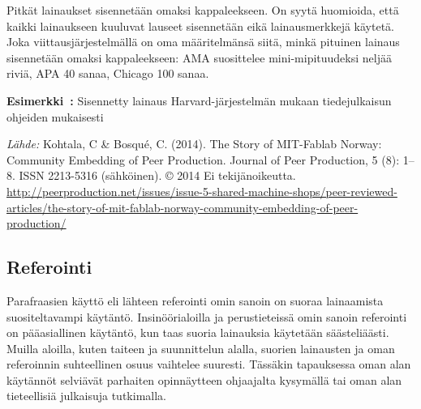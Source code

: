 \documentclass[finnish, 12pt, a4paper, elec, utf8, a-2b, online]{aaltothesis}
\begin{document}
Pitkät lainaukset sisennetään omaksi kappaleekseen. On syytä huomioida, että 
kaikki lainaukseen kuuluvat lauseet sisennetään eikä lainausmerkkejä käytetä. 
Joka viittausjärjestelmällä on oma määritelmänsä siitä, minkä pituinen lainaus 
sisennetään omaksi kappaleekseen: AMA suosittelee mini-mipituudeksi neljää 
riviä, APA 40 sanaa, Chicago 100 sanaa.

\vspace{1em}
\noindent
{}
\textsf{\textbf{Esimerkki~\theexample:}} Sisennetty lainaus Harvard-järjestelmän mukaan tiedejulkaisun ohjeiden mukaisesti

\vspace{1ex}
{\centering
{}
}

\vspace{1ex}
\noindent
\textit{Lähde:} Kohtala, C \& Bosqu\'e, C. (2014). The Story of MIT-Fablab 
Norway: Community Embedding of Peer Production. Journal of Peer Production, 
5 (8): 1--8. ISSN 2213-5316 (sähköinen). \copyright{} 2014 Ei tekijänoikeutta. 
\url{http://peerproduction.net/issues/issue-5-shared-machine-shops/peer-reviewed-articles/the-story-of-mit-fablab-norway-community-embedding-of-peer-production/}


\subsection*{Referointi}

Parafraasien käyttö eli lähteen referointi omin sanoin on suoraa lainaamista 
suositeltavampi käytäntö. Insinöörialoilla ja perustieteissä omin sanoin 
referointi on pääasiallinen käytäntö, kun taas suoria lainauksia käytetään 
säästeliäästi. Muilla aloilla, kuten taiteen ja suunnittelun alalla, suorien 
lainausten ja oman referoinnin suhteellinen osuus vaihtelee suuresti. Tässäkin 
tapauksessa oman alan käytännöt selviävät parhaiten opinnäytteen ohjaajalta 
kysymällä tai oman alan tieteellisiä julkaisuja tutkimalla.
\end{document}
